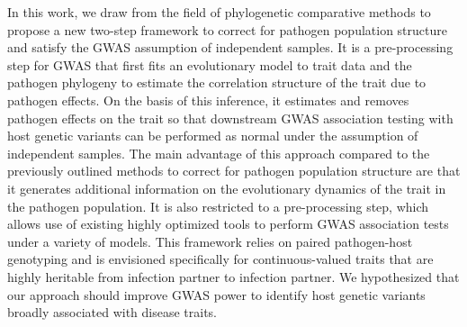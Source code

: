 \documentclass[11pt]{article}
\begin{document}
\begin{linenumbers}
In this work, we draw from the field of phylogenetic comparative methods to propose a new two-step framework to correct for pathogen population structure and satisfy the GWAS assumption of independent samples. It is a pre-processing step for GWAS that first fits an evolutionary model to trait data and the pathogen phylogeny to estimate the correlation structure of the trait due to pathogen effects. On the basis of this inference, it estimates and removes pathogen effects on the trait so that downstream GWAS association testing with host genetic variants can be performed as normal under the assumption of independent samples. The main advantage of this approach compared to the previously outlined methods to correct for pathogen population structure are that it generates additional information on the evolutionary dynamics of the trait in the pathogen population. It is also restricted to a pre-processing step, which allows use of existing highly optimized tools to perform GWAS association tests under a variety of models. This framework relies on paired pathogen-host genotyping and is envisioned specifically for continuous-valued traits that are highly heritable from infection partner to infection partner.
We hypothesized that our approach should improve GWAS power to identify host genetic variants broadly associated with disease traits.



\end{linenumbers}
\end{document}
